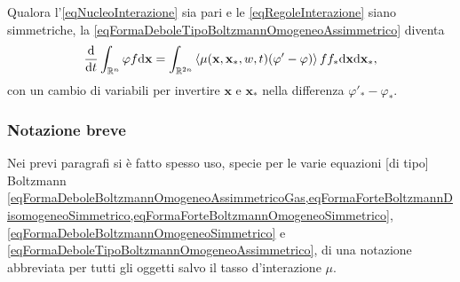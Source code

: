         \begin{oss}
          Qualora l'\ref{eqNucleoInterazione} sia pari e le \ref{eqRegoleInterazione} siano simmetriche, la \ref{eqFormaDeboleTipoBoltzmannOmogeneoAssimmetrico} diventa
          \begin{equation}
            \label{eqFormaDeboleTipoBoltzmannOmogeneoSimmetrico}
            \frac{\mathrm{d}}{\mathrm{d}t}\int_{\mathbb R^n}\varphi f\mathrm{d}\mathbf x=
            \int_{\mathbb R^{2n}}\left\langle
                \mu(\mathbf x,\mathbf x_*,w,t)(\varphi'-\varphi)
              \right\rangle
            ff_*\mathrm{d}\mathbf x\mathrm{d}\mathbf x_*,
          \end{equation}
          con un cambio di variabili per invertire \(\mathbf x\) e \(\mathbf x_*\) nella differenza \(\varphi'_*-\varphi_*\).
        \end{oss}

      \subsubsection{Notazione breve}

        Nei previ paragrafi si è fatto spesso uso, specie per le varie equazioni [di tipo] Boltzmann \cref{eqFormaDeboleBoltzmannOmogeneoAssimmetricoGas,eqFormaForteBoltzmannDisomogeneoSimmetrico,eqFormaForteBoltzmannOmogeneoSimmetrico}, \ref{eqFormaDeboleBoltzmannOmogeneoSimmetrico} e \ref{eqFormaDeboleTipoBoltzmannOmogeneoAssimmetrico}, di una notazione abbreviata per tutti gli oggetti salvo il tasso d'interazione \(\mu\).
        
